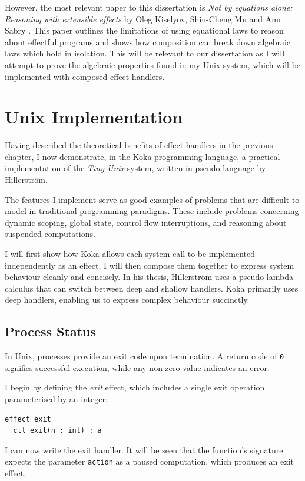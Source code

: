 \documentclass[logo,bsc,singlespacing,parskip]{infthesis}
\begin{document}
However, the most relevant paper to this dissertation is \textit{Not by equations alone: Reasoning with extensible effects} by Oleg Kiselyov, Shin-Cheng Mu and Amr Sabry \cite{kiselyov2021not}. This paper outlines the limitations of using equational laws to reason about effectful programs and shows how composition can break down algebraic laws which hold in isolation. This will be relevant to our dissertation as I will attempt to prove the algebraic properties found in my Unix system, which will be implemented with composed effect handlers.



\chapter{Unix Implementation}
Having described the theoretical benefits of effect handlers in the previous chapter, I now demonstrate, in the Koka programming language, a practical implementation of the \textit{Tiny Unix} system, written in pseudo-language by Hillerström. 

The features I implement serve as good examples of problems that are difficult to model in traditional programming paradigms. These include problems concerning dynamic scoping, global state, control flow interruptions, and reasoning about suspended computations.

I will first show how Koka allows each system call to be implemented independently as an effect. I will then compose them together to express system behaviour cleanly and concisely.
In his thesis, Hillerström uses a pseudo-lambda calculus that can switch between deep and shallow handlers. Koka primarily uses deep handlers, enabling us to express complex behaviour succinctly.



\section{Process Status}
In Unix, processes provide an exit code upon termination. A return code of \lstinline{0} signifies successful execution, while any non-zero value indicates an error. 

I begin by defining the \textit{exit} effect, which includes a single exit operation parameterised by an integer:
\begin{lstlisting}
effect exit
  ctl exit(n : int) : a
\end{lstlisting}

\vspace{1em}
I can now write the exit handler. It will be seen that the function's signature expects the parameter \lstinline{action} as a paused computation, which produces an exit effect.
\end{document}
